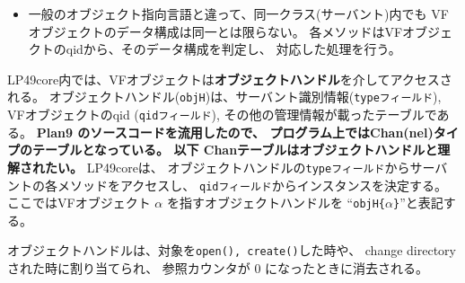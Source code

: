 {\begin{itemize}
\item  一般のオブジェクト指向言語と違って、同一クラス(サーバント)内でも
       VFオブジェクトのデータ構成は同一とは限らない。
       各メソッドはVFオブジェクトのqidから、そのデータ構成を判定し、
       対応した処理を行う。
\end{itemize}

  LP49core内では、VFオブジェクトは{\bf オブジェクトハンドル}を介してアクセスされる。
オブジェクトハンドル({\tt objH})は、サーバント識別情報({\tt typeフィールド}), 
VFオブジェクトのqid ({\tt qidフィールド}), 
その他の管理情報が載ったテーブルである。
{\bf Plan9 のソースコードを流用したので、
プログラム上ではChan(nel)タイプのテーブルとなっている。
以下 Chanテーブルはオブジェクトハンドルと理解されたい。}
LP49coreは、
オブジェクトハンドルの{\tt typeフィールド}からサーバントの各メソッドをアクセスし、
{\tt qidフィールド}からインスタンスを決定する。
%
ここではVFオブジェクト $\alpha$ を指すオブジェクトハンドルを
``{\tt objH\{$\alpha$\}}''と表記する。

オブジェクトハンドルは、対象を{\tt open(), create()}した時や、
change directory された時に割り当てられ、
参照カウンタが 0 になったときに消去される。



\begin{comment}
Plan9と同様、LP49 では殆どリソースを「ファイル」として抽象化している。
個々の``抽象ファイル''は、サーバント内あるいはサーバ内に存在し、
名前空間(directory tree)を通してアクセスされる。

これは、図 \ref{fig:VirtualFileObject}に示すように、
オブジェクト指向の観点から、
``抽象ファイル''をインスタンスオブジェクト、
``サーバント定義''をクラス定義
として捉えると理解し易い。

\begin{figure}[hbt]
  \begin{center}
   \epsfxsize=440pt
   \epsfbox{fig/VirtualFileObject.eps}
    \caption{仮想ファイルのオブジェクトモデル}
    \label{fig:VirtualFileObject}
  \end{center}
\end{figure}


\end{comment}}
